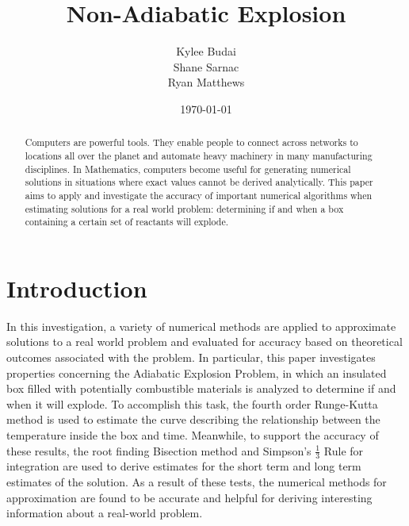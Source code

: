 \documentclass{article}
\title{Non-Adiabatic Explosion}
\author{Kylee Budai\\Shane Sarnac\\Ryan Matthews}
\date{\today}
\begin{document}
\maketitle


\begin{abstract}
    \noindent  Computers are powerful tools. They enable people to connect across networks to locations all over the planet and automate heavy machinery in many manufacturing disciplines. In Mathematics, computers become useful for generating numerical solutions in situations where exact values cannot be derived analytically. This paper aims to apply and investigate the accuracy of important numerical algorithms when estimating solutions for a real world problem: determining if and when a box containing a certain set of reactants will explode. 
\end{abstract}
\section*{Introduction}
 In this investigation, a variety of numerical methods are applied to approximate solutions to a real world problem and evaluated for accuracy based on theoretical outcomes associated with the problem. In particular, this paper investigates properties concerning the Adiabatic Explosion Problem, in which an insulated box filled with potentially combustible materials is analyzed to determine if and when it will explode. To accomplish this task, the fourth order Runge-Kutta method is used to estimate the curve describing the relationship between the temperature inside the box and time. Meanwhile, to support the accuracy of these results, the root finding Bisection method and Simpson's $\frac{1}{3}$ Rule for integration are used to derive estimates for the short term and long term estimates of the solution. As a result of these tests, the numerical methods for approximation are found to be accurate and helpful for deriving interesting information about a real-world problem.  
\end{document}
